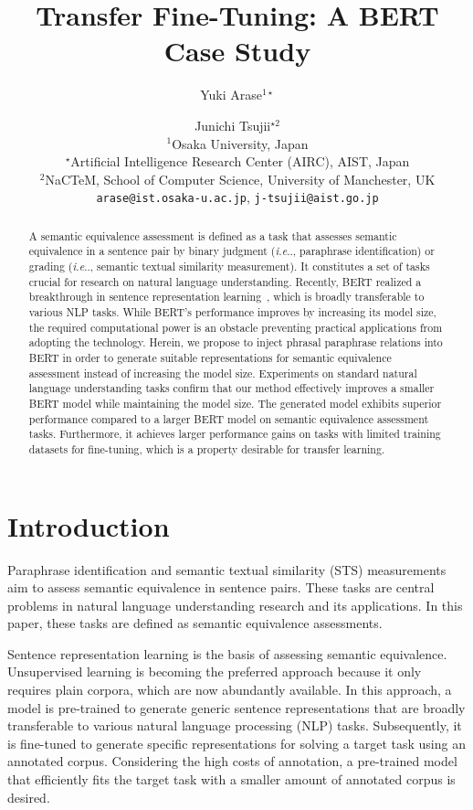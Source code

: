 \documentclass[11pt,a4paper]{article}
\title{Transfer Fine-Tuning: A BERT Case Study}
\author{Yuki Arase$^{1 \star}$ \and Junichi Tsujii$^{\star 2}$ \\
$^1$Osaka University, Japan\\
$^\star$Artificial Intelligence Research Center (AIRC), AIST, Japan\\
$^2$NaCTeM, School of Computer Science, University of Manchester, UK \\
 {\tt arase@ist.osaka-u.ac.jp},  {\tt j-tsujii@aist.go.jp}\\
 }
\date{}
\makeatletter
\DeclareRobustCommand\onedot{\futurelet\@let@token\@onedot}
\def\@onedot{\ifx\@let@token.\else.\null\fi\xspace}
\def\ie{\emph{i.e}\onedot} \def\Ie{\emph{I.e}\onedot}
\makeatother
\begin{document}
\maketitle
\begin{abstract}
A semantic equivalence assessment is defined as a task that assesses semantic equivalence in a sentence pair by binary judgment (\ie, paraphrase identification) or grading (\ie, semantic textual similarity measurement). 
It constitutes a set of tasks crucial for research on natural language understanding. 
Recently, BERT realized a breakthrough in sentence representation learning~\cite{bert}, which is broadly transferable to various NLP tasks. 
While BERT's performance improves by increasing its model size, the required computational power is an obstacle preventing practical applications from adopting the technology. 
Herein, we propose to inject phrasal paraphrase relations into BERT in order to generate suitable representations for semantic equivalence assessment instead of increasing the model size. 
Experiments on standard natural language understanding tasks confirm that our method effectively improves a smaller BERT model while maintaining the model size. 
The generated model exhibits superior performance compared to a larger BERT model on semantic equivalence assessment tasks. 
Furthermore, it achieves larger performance gains on tasks with limited training datasets for fine-tuning, which is a property desirable for transfer learning.  
\end{abstract}

\section{Introduction}
Paraphrase identification and semantic textual similarity (STS) measurements aim to assess semantic equivalence in sentence pairs. 
These tasks are central problems in natural language understanding research and its applications. 
In this paper, these tasks are defined as semantic equivalence assessments.


Sentence representation learning is the basis of assessing semantic equivalence. 
Unsupervised learning is becoming the preferred approach because it only requires plain corpora, which are now abundantly available. 
In this approach, a model is pre-trained to generate generic sentence representations that are broadly transferable to various natural language processing (NLP) tasks. 
Subsequently, it is fine-tuned to generate specific representations for solving a target task using an annotated corpus. 
Considering the high costs of annotation, a pre-trained model that efficiently fits the target task with a smaller amount of annotated corpus is desired.
\end{document}
